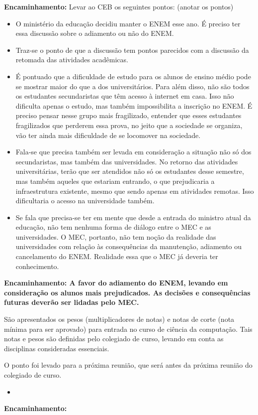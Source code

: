 \documentclass{ata-calico}
\begin{document}
\textbf{Encaminhamento:} Levar ao CEB os seguintes pontos: (anotar os pontos)

\begin{itemize}
\item O ministério da educação decidiu manter o ENEM esse ano. É preciso ter essa discussão sobre o adiamento ou não do ENEM.
\item Traz-se o ponto de que a discussão tem pontos parecidos com a discussão da retomada das atividades acadêmicas.
\item É pontuado que a dificuldade de estudo para os alunos de ensino médio pode se mostrar maior do que a dos universitários. Para além disso, não são todos os estudantes secundaristas que têm acesso à internet em casa. Isso não dificulta apenas o estudo, mas também impossibilita a inscrição no ENEM. É preciso pensar nesse grupo mais fragilizado, entender que esses estudantes fragilizados que perderem essa prova, no jeito que a sociedade se organiza, vão ter ainda mais dificuldade de se locomover na sociedade.
\item Fala-se que precisa também ser levada em consideração a situação não só dos secundaristas, mas também das universidades. No retorno das atividades universitárias, terão que ser atendidos não só os estudantes desse semestre, mas também aqueles que estariam entrando, o que prejudicaria a infraestrutura existente, mesmo que sendo apenas em atividades remotas. Isso dificultaria o acesso na universidade também.
\item Se fala que precisa-se ter em mente que desde a entrada do ministro atual da educação, não tem nenhuma forma de diálogo entre o MEC e as universidades. O MEC, portanto, não tem noção da realidade das universidades com relação às consequências da manutenção, adiamento ou cancelamento do ENEM. Realidade essa que o MEC já deveria ter conhecimento.
\end{itemize}

\textbf{Encaminhamento: A favor do adiamento do ENEM, levando em consideração os alunos mais prejudicados. As decisões e consequências futuras deverão ser lidadas pelo MEC.}

São apresentados os pesos (multiplicadores de notas) e notas de corte (nota mínima para ser aprovado) para entrada no curso de ciência da computação. Tais notas e pesos são definidas pelo colegiado de curso, levando em conta as disciplinas consideradas essenciais.

O ponto foi levado para a próxima reunião, que será antes da próxima reunião do colegiado de curso.

\begin{itemize}
\item 
\end{itemize}

\textbf{Encaminhamento:}

\end{document}
